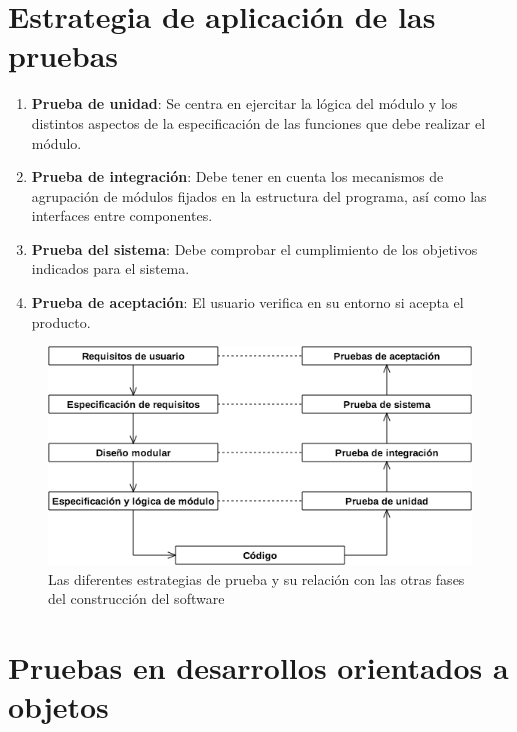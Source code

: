 \section{Estrategia de aplicación de las pruebas}
\begin{enumerate} %
    \item \textbf{Prueba de unidad}: Se centra en ejercitar la lógica del módulo y los distintos aspectos de la especificación de las funciones que debe realizar el módulo.
    \item \textbf{Prueba de integración}: Debe tener en cuenta los mecanismos de agrupación de módulos fijados en la estructura del programa, así como las interfaces entre componentes.
    \item \textbf{Prueba del sistema}: Debe comprobar el cumplimiento de los objetivos indicados para el sistema.
    \item \textbf{Prueba de aceptación}: El usuario verifica en su entorno si acepta el producto.
\end{enumerate}
\begin{figure}[H]
  \centering
  \includegraphics[width=0.7\linewidth]{Resources/enfoquePruebas}
  \caption{Las diferentes estrategias de prueba y su relación con las otras fases del construcción del software}
  \label{fig:estrategiasPruebas}
\end{figure}


\newpage
\section{Pruebas en desarrollos orientados a objetos}
